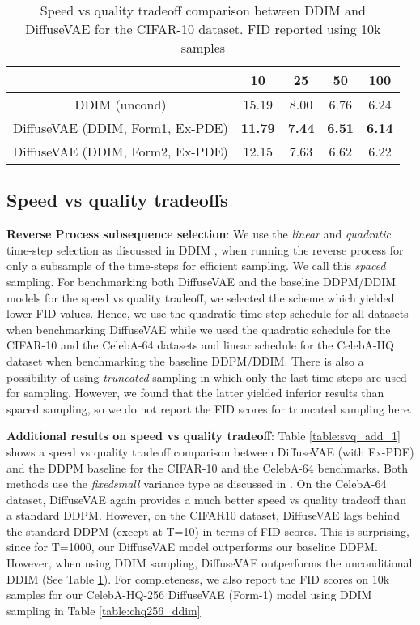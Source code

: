 \documentclass[10pt]{article} \usepackage[accepted]{tmlr}
\begin{document}
\begin{table}[]
\footnotesize
\centering
\begin{tabular}{@{}ccccc@{}}
\toprule
                                 & 10             & 25            & 50            & 100           \\ \midrule
DDIM (uncond)                    & 15.19 & 8.00 & 6.76 & 6.24 \\
DiffuseVAE (DDIM, Form1, Ex-PDE) & \textbf{11.79}         & \textbf{7.44}         & \textbf{6.51}         & \textbf{6.14}          \\
DiffuseVAE (DDIM, Form2, Ex-PDE) & 12.15          & 7.63         & 6.62          & 6.22          \\ \bottomrule
\end{tabular}
\caption{Speed vs quality tradeoff comparison between DDIM and DiffuseVAE for the CIFAR-10 dataset. FID reported using 10k samples}
\label{table:svq_add_2}
\end{table}

\subsection{Speed vs quality tradeoffs}

\textbf{Reverse Process subsequence selection}: We use the \textit{linear} and \textit{quadratic} time-step selection as discussed in DDIM \citep{song2021denoising}, when running the reverse process for only a subsample of the time-steps for efficient sampling. We call this \textit{spaced} sampling. For benchmarking both DiffuseVAE and the baseline DDPM/DDIM models for the speed vs quality tradeoff, we selected the scheme which yielded lower FID values. Hence, we use the quadratic time-step schedule for all datasets when benchmarking DiffuseVAE while we used the quadratic schedule for the CIFAR-10 and the CelebA-64 datasets and linear schedule for the CelebA-HQ dataset when benchmarking the baseline DDPM/DDIM. There is also a possibility of using \textit{truncated} sampling in which only the last  time-steps are used for sampling. However, we found that the latter yielded inferior results than spaced sampling, so we do not report the FID scores for truncated sampling here.

\textbf{Additional results on speed vs quality tradeoff}:
Table \ref{table:svq_add_1} shows a speed vs quality tradeoff comparison between DiffuseVAE (with Ex-PDE) and the DDPM baseline for the CIFAR-10 and the CelebA-64 benchmarks. Both methods use the \textit{fixedsmall} variance type as discussed in \citep{ho2020denoising}. On the CelebA-64 dataset, DiffuseVAE again provides a much better speed vs quality tradeoff than a standard DDPM. However, on the CIFAR10 dataset, DiffuseVAE lags behind the standard DDPM (except at T=10) in terms of FID scores. This is surprising, since for T=1000, our DiffuseVAE model outperforms our baseline DDPM. However, when using DDIM sampling, DiffuseVAE outperforms the unconditional DDIM (See Table \ref{table:svq_add_2}).
For completeness, we also report the FID scores on 10k samples for our CelebA-HQ-256 DiffuseVAE (Form-1) model using DDIM sampling in Table \ref{table:chq256_ddim}
\end{document}
